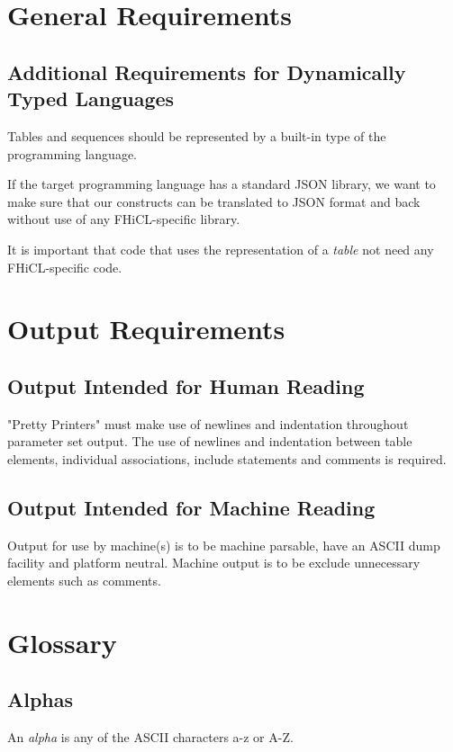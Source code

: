 \documentclass{memarticle}
\begin{document}
\chapter{General Requirements}
        \section{Additional Requirements for Dynamically Typed Languages}
                Tables and sequences should be represented by a built-in type of the
                programming language.

                If the target programming language has a standard JSON library, we
                want to make sure that our constructs can be translated to JSON format
                and back without use of any FHiCL-specific library.

                It is important that code that uses the representation of a
                \emph{table} not need any FHiCL-specific code.

\chapter{Output Requirements}
        \section{Output Intended for Human Reading}
                "Pretty Printers" must make use of newlines and indentation throughout parameter set output.
                The use of newlines and indentation between table elements, individual associations, include statements
                and comments is required.
        \section{Output Intended for Machine Reading}
                Output for use by machine(s) is to be machine parsable,
                have an ASCII dump facility and platform neutral.
                Machine output is to be exclude unnecessary elements such as comments.

\chapter{Glossary}
                \section{Alphas}
                        An \emph{alpha} is any of the ASCII characters a-z or A-Z.
\end{document}
